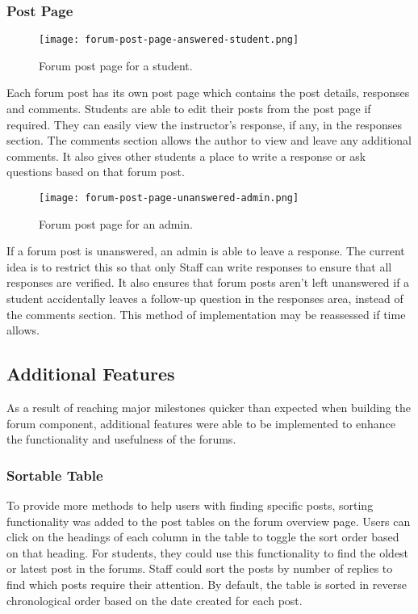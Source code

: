 \subsubsection{Post Page}

\begin{figure}[h!]
    \texttt{[image: forum-post-page-answered-student.png]}
    \centering
    \caption{Forum post page for a student.}
\end{figure}

Each forum post has its own post page which contains the post details, responses and comments.
Students are able to edit their posts from the post page if required.
They can easily view the instructor's response, if any, in the responses section.
The comments section allows the author to view and leave any additional comments.
It also gives other students a place to write a response or ask questions based on that forum post.

\newpage

\begin{figure}[h!]
    \texttt{[image: forum-post-page-unanswered-admin.png]}
    \centering
    \caption{Forum post page for an admin.}
\end{figure}

If a forum post is unanswered, an admin is able to leave a response.
The current idea is to restrict this so that only Staff can write responses to ensure that all responses are verified.
It also ensures that forum posts aren't left unanswered if a student accidentally leaves a follow-up question in the responses area, instead of the comments section.
This method of implementation may be reassessed if time allows.

\subsection{Additional Features}
As a result of reaching major milestones quicker than expected when building the forum component, additional features were able to be implemented to enhance the functionality and usefulness of the forums.

\subsubsection{Sortable Table}
To provide more methods to help users with finding specific posts, sorting functionality was added to the post tables on the forum overview page.
Users can click on the headings of each column in the table to toggle the sort order based on that heading.
For students, they could use this functionality to find the oldest or latest post in the forums.
Staff could sort the posts by number of replies to find which posts require their attention.
By default, the table is sorted in reverse chronological order based on the date created for each post.

